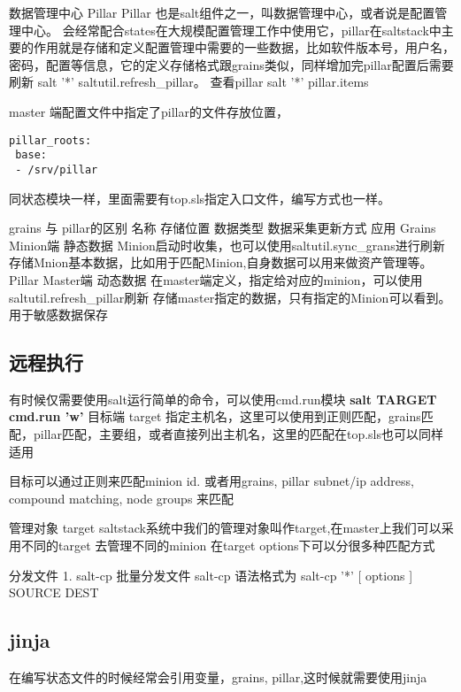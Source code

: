 数据管理中心 Pillar
Pillar 也是salt组件之一，叫数据管理中心，或者说是配置管理中心。 会经常配合states在大规模配置管理工作中使用它，pillar在saltstack中主要的作用就是存储和定义配置管理中需要的一些数据，比如软件版本号，用户名，密码，配置等信息，它的定义存储格式跟grains类似，同样增加完pillar配置后需要刷新 salt '*' saltutil.refresh_pillar。 查看pillar salt '*' pillar.items 
 
master 端配置文件中指定了pillar的文件存放位置，
\begin{lstlisting}
pillar_roots:
 base:
 - /srv/pillar
\end{lstlisting}

同状态模块一样，里面需要有top.sls指定入口文件，编写方式也一样。



grains 与 pillar的区别
名称	存储位置	数据类型	数据采集更新方式	应用
Grains	Minion端	静态数据	Minion启动时收集，也可以使用saltutil.sync_grans进行刷新	存储Mnion基本数据，比如用于匹配Minion,自身数据可以用来做资产管理等。
Pillar	Master端	动态数据	在master端定义，指定给对应的minion，可以使用saltutil.refresh_pillar刷新	存储master指定的数据，只有指定的Minion可以看到。用于敏感数据保存

\subsection{远程执行}


有时候仅需要使用salt运行简单的命令，可以使用cmd.run模块  \textbf{salt TARGET cmd.run 'w'}
目标端 target 指定主机名，这里可以使用到正则匹配，grains匹配，pillar匹配，主要组，或者直接列出主机名，这里的匹配在top.sls也可以同样适用

目标可以通过正则来匹配minion id. 或者用grains, pillar subnet/ip address, compound matching, node groups 来匹配


管理对象 target
saltstack系统中我们的管理对象叫作target,在master上我们可以采用不同的target 去管理不同的minion
在target options下可以分很多种匹配方式

分发文件
1. salt-cp 批量分发文件 salt-cp 语法格式为
salt-cp '*' [ options ] SOURCE DEST


\subsection{jinja}


在编写状态文件的时候经常会引用变量，grains, pillar,这时候就需要使用jinja

